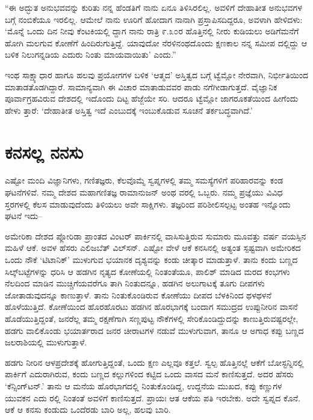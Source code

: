 “ಈ ಅದ್ಭುತ ಅನುಭವವನ್ನು ಕುರಿತು ನನ್ನ ಹೆಂಡತಿಗೆ ನಾನು ಏನೂ ತಿಳಿಸಿರಲಿಲ್ಲ. ಅವಳಿಗೆ ದೇಹಾತೀತ ಅನುಭವಗಳ ಬಗ್ಗೆ ನಂಬಿಕೆಯೂ ಇರಲಿಲ್ಲ. ಆಮೇಲೆ ನಾನು ಊರಿಗೆ ಹೋದಾಗ ನಾನಾಗಿ ಪ್ರಸ್ತಾಪಿಸದಿದ್ದರೂ, ಅವಳಾಗಿ ಹೇಳಿದಳು: ‘ಮೊನ್ನೆ ಒಂದು ದಿನ ನೀವು ಕೆಂಟಕಿಯಲ್ಲಿ ದ್ದಾಗ ನಾನು ರಾತ್ರಿ ೯.೩೦ರ ಹೊತ್ತಿನಲ್ಲಿ ನೀರು ಕುಡಿಯಲು ಅಡಿಗೆಮನೆಗೆ ಹೋಗಿ ಮಲಗುವ ಕೋಣೆಗೆ ಹಿಂದಿರುಗುತ್ತಿದ್ದೆ. ಯಾವುದೋ ನೆರಳಿನಂಥದೊಂದು ಕ್ಷಣಕಾಲ ನನ್ನ ಸಮೀಪ ದಲ್ಲಿದ್ದು ಆ ಬಳಿಕ ನಿಲುಗನ್ನಡಿಯ ಎದುರು ನಿಂತು ಮಾಯವಾಯಿತು’ ಎಂದು.”

ಇಂಥ ಸಾಕ್ಷ್ಯಾಧಾರ ಹಾಗೂ ಹಲವು ಪ್ರಯೋಗಗಳ ಬಳಿಕ ‘ಆತ್ಮದ’ ಅಸ್ತಿತ್ವದ ಬಗ್ಗೆ ಟ್ವೆಮ್ಲೋ ನೇರವಾಗಿ, ನಿರ್ಭೀತಿಯಿಂದ ಮಾತಾಡತೊಡಗಿದ್ದಾರೆ. ಸಾಮಾನ್ಯವಾಗಿ ಈ ವಿಚಾರ ಮಾತಾಡುವವರ ಪಾಡು ನಗೆಗೀಡಾಗುತ್ತದೆ. ವೈಜ್ಞಾನಿಕ ಪೂರ್ವಾಗ್ರಹವಿರುವ ದೇಶದಲ್ಲಿ ಇದೊಂದು ದಿಟ್ಟ ಹೆಜ್ಜೆಯೇ ಸರಿ. ಆದರೂ ಟ್ವೆಮ್ಲೋ ಜಾಗರೂಕತೆಯಿಂದ ಹೀಗೆಂದು ಹೇಳು ತ್ತಾರೆ: ‘ದೇಹಾತೀತ ಅಸ್ತಿತ್ವ ಇದೆ ಎಂಬುದಕ್ಕೆ ಇಂಬುಕೊಡುವ ಸೂಚನೆ ತರ್ಕಬದ್ಧವಾಗಿದೆ.’


\section{ಕನಸಲ್ಲ ನನಸು}

ಎಷ್ಟೋ ಮಂದಿ ವಿಜ್ಞಾನಿಗಳು, ಗಣಿತಜ್ಞರು, ಕೆಲವೊಮ್ಮೆ ಸ್ವಪ್ನಗಳಲ್ಲಿ ತಮ್ಮ ಸಮಸ್ಯೆಗಳಿಗೆ ಪರಿಹಾರವನ್ನು ಕಂಡ ಘಟನೆಗಳಿವೆ. ನಮ್ಮ ದೇಶದ ಮಹಾಗಣಿತಜ್ಞ ರಾಮಾನುಜನ್ ಅಂಥ ವರಲ್ಲಿ ಒಬ್ಬರು. ನಮ್ಮ ಪ್ರಜ್ಞೆಯು ವಿವಿಧ ಸ್ತರಗಳಲ್ಲಿ ಕೆಲಸ ಮಾಡುವುದೆಂದು ತಿಳಿಯಲು ಅವೇ ಸಾಕ್ಷಿಗಳು. ತಜ್ಞರಿಂದ ಪರಿಶೀಲಿಸಲ್ಪಟ್ಟ ಅಂತಹ ಇನ್ನೊಂದು ಘಟನೆ ಇದು–

ಅಮೇರಿಕಾ ದೇಶದ ಪ್ಲೋರಿಡಾ ಪ್ರಾಂತದ ವಿಂಟರ್ ಪಾರ್ಕಿನಲ್ಲಿ ವಾಸಿಸುತ್ತಿರುವ ಸುಮಾರು ಮೂವತ್ತು ವರ್ಷ ವಯಸ್ಸಿನ ಮಹಿಳೆ ಆಕೆ. ಅವಳ ಹೆಸರು ಎಲಿಜಬೆತ್ ವಿಲ್​ಸನ್. ಎಷ್ಟೋ ವೇಳೆ ಆಕೆ ಕನಸಿನಲ್ಲಿ ಅತ್ಯಂತ ಸ್ಪಷ್ಟವಾಗಿ ಅಮೇರಿಕದ ಒಂದು ನೌಕೆ ‘ಟಿಟಾನಿಕ್​’ ಮುಳುಗುವ ಭಯಾನಕ ದೃಶ್ಯವನ್ನು ಕಂಡು ಚೀತ್ಕಾರ ಮಾಡುತ್ತಾಳೆ. ತಾನು ಕಂದು ಬಣ್ಣದ ಸಿಲ್ಕ್​ಬಟ್ಟೆಗಳನ್ನು ಧರಿಸಿ ಆ ಹಡಗಿನ ನೃತ್ಯದ ಕೋಣೆಯಲ್ಲಿ ನಿಂತಂತೆಯೂ, ಪಾಲಿಶ್ ಮಾಡಿದ ಮರದ ಕಂಭಗಳು ನೆಲದಿಂದ ಮಾಡಿನ ಮುಚ್ಚಿಗೆಯವರೆಗೂ ತಾಗಿ ನಿಂತುದನ್ನೂ, ಹಡಗಿನ ಅಲುಗಾಟಕ್ಕೆ ತೂಗು ದೀಪಗಳು ಜೋತಾಡುವುದನ್ನೂ ಕಾಣುತ್ತಾಳೆ. ತಾನು ನಿಂತುಕೊಂಡಿರುವ ಕೋಣೆಯು ದೀಪದ ಬೆಳಕಿನಿಂದ ಥಳಥಳನೆ ಹೊಳೆಯುತ್ತಿದೆ. ಕೋಣೆಯಿಂದ ಹೊರಹೊರಟು ಹಡಗಿನ ಹೊರಭಾಗಕ್ಕೆ ಬಂದಾಗ ಸಮುದ್ರದ ಉಪ್ಪುನೀರಿನ ವಾಸನೆ ಹೊಡೆಯುತ್ತಿದ್ದಂತೆ, ಜನರೆಲ್ಲ ತಮ್ಮ ರಕ್ಷಣೆಗಾಗಿ ಸಣ್ಣಪುಟ್ಟ ನೌಕೆಗಳಲ್ಲಿ ಸೇರಿಕೊಂಡಿದ್ದುದನ್ನು ಕಾಣುತ್ತಿರುವಷ್ಟರಲ್ಲೇ, ಹಡಗು ವಾಲಿಕೊಂಡು ಭಯಾರ್ತರಾದ ಜನರ ಚೀರಾಟಗಳ ನಡುವೆ ಮುಳುಗುವಾಗ, ತಾನೂ ಆ ಅಗಾಧ ಕಪ್ಪು ಬಣ್ಣದ ಜಲರಾಶಿಯಲ್ಲಿ ಮುಳುಗುತ್ತಾಳೆ.

ಹಡಗು ನೀರಿನ ಆಳಪ್ರದೇಶಕ್ಕೆ ಹೋಗುತ್ತಿದ್ದಂತೆ, ಒಂದು ಕ್ಷಣ ಎಲ್ಲವೂ ಕತ್ತಲೆ. ಸ್ವಲ್ಪ ಹೊತ್ತಿನಲ್ಲೆ ಆಕೆಗೆ ಬೋಸ್ಟನ್ನಿನಲ್ಲಿ ಪಾರ್ಕಿಗೆ ಎದುರಾಗಿರುವ, ಕಂದು ಬಣ್ಣದ ಕಲ್ಲುಗಳಿಂದ ಕಟ್ಟಿದ ಒಂದು ವಾಸದ ಮನೆ ಕಾಣಿಸುತ್ತದೆ. ಅದರ ಹೆಸರು ‘ಕೆನ್ಸಿಂಗ್​ಟನ್.’ ತಾನು ಆ ಮನೆಯ ಹೊರಭಾಗದಲ್ಲಿ ನಿಂತುಕೊಂಡಿದ್ದ, ಉದ್ದನೆಯ ಮುಖದ, ಕಪ್ಪು ಕಣ್ಣುಗಳ ಯುವಕನ ಎದು ರಲ್ಲಿ ನಿಂತಂತೆ ಅವಳಿಗೆ ಕಾಣಿಸುತ್ತದೆ. ಪ್ರಾಯಃ ಆತ ಆಕೆಯ ಪತಿ ಇರಬೇಕು. ಅದೇ ಸ್ವಪ್ನದ ಕೊನೆ. ಆಕೆ ಆ ಕನಸು ಕಂಡುದು ಒಂದೆರಡು ಬಾರಿ ಅಲ್ಲ, ಹಲವು ಬಾರಿ.

